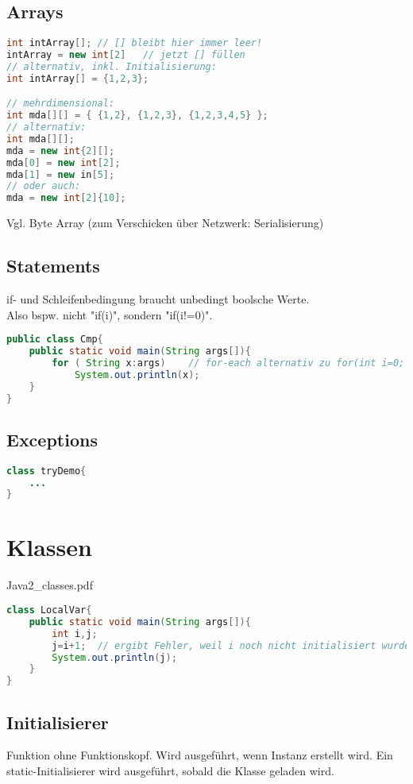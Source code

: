 \subsection{Arrays}
\begin{lstlisting}[language=Java]
int intArray[];	// [] bleibt hier immer leer!
intArray = new int[2]	// jetzt [] füllen
// alternativ, inkl. Initialisierung:
int intArray[] = {1,2,3};

// mehrdimensional:
int mda[][] = { {1,2}, {1,2,3}, {1,2,3,4,5} };
// alternativ:
int mda[][];
mda = new int{2][];
mda[0] = new int[2];
mda[1] = new in[5];
// oder auch:
mda = new int[2]{10];
\end{lstlisting}
Vgl. Byte Array (zum Verschicken über Netzwerk: Serialisierung)

\subsection{Statements}
if- und Schleifenbedingung braucht unbedingt boolsche Werte.\\
Also bspw. nicht "if(i)", sondern "if(i!=0)".

\begin{lstlisting}[language=Java]
public class Cmp{
	public static void main(String args[]){		
		for ( String x:args) 	// for-each alternativ zu for(int i=0; i<args.length; i++) {x=args[i]; System.out.println(x);}
			System.out.println(x);
	}
}
\end{lstlisting}

\subsection{Exceptions}
\begin{lstlisting}[language=Java]
class tryDemo{
	...
}
\end{lstlisting}

\section{Klassen}
Java2\_classes.pdf

\begin{lstlisting}[language=Java]
class LocalVar{
	public static void main(String args[]){
		int i,j;
		j=i+1;	// ergibt Fehler, weil i noch nicht initialisiert wurde.
		System.out.println(j);
	}
}
\end{lstlisting}

\subsection{Initialisierer}
Funktion ohne Funktionskopf. Wird ausgeführt, wenn Instanz erstellt wird. Ein static-Initialisierer wird ausgeführt, sobald die Klasse geladen wird.


\newpage
\printbibliography
